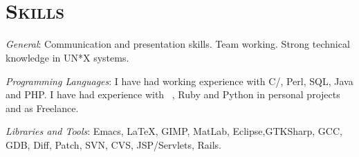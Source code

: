 \begin{resume}



 \begin{formatb}
   \\
   \body\\
 \end{formatb}



\section{\textsc{Skills}}

\emph{General}: Communication and presentation skills. Team
working. Strong technical knowledge in UN*X systems.

\emph{Programming Languages}: I have had working experience with
 C/\Cplusplus, Perl, SQL, Java and PHP. I have had experience with \
 \CSharp, Ruby and Python in personal projects and as Freelance.

\emph{Libraries and Tools}: Emacs, \LaTeX, GIMP, MatLab, Eclipse,GTKSharp, GCC, GDB, Diff, Patch, SVN, CVS, JSP/Servlets, Rails.


\end{resume}
